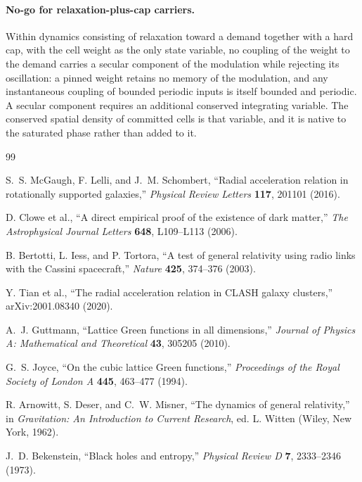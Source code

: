 \documentclass[11pt]{article}
\begin{document}
\paragraph{No-go for relaxation-plus-cap carriers.} Within dynamics consisting of relaxation toward a demand together with a hard cap, with the cell weight as the only state variable, no coupling of the weight to the demand carries a secular component of the modulation while rejecting its oscillation: a pinned weight retains no memory of the modulation, and any instantaneous coupling of bounded periodic inputs is itself bounded and periodic. A secular component requires an additional conserved integrating variable. The conserved spatial density of committed cells is that variable, and it is native to the saturated phase rather than added to it.

\begin{thebibliography}{99}

S.~S. McGaugh, F. Lelli, and J.~M. Schombert,
``Radial acceleration relation in rotationally supported galaxies,''
\emph{Physical Review Letters} \textbf{117}, 201101 (2016).

D. Clowe et al.,
``A direct empirical proof of the existence of dark matter,''
\emph{The Astrophysical Journal Letters} \textbf{648}, L109--L113 (2006).

B. Bertotti, L. Iess, and P. Tortora,
``A test of general relativity using radio links with the Cassini spacecraft,''
\emph{Nature} \textbf{425}, 374--376 (2003).

Y. Tian et al.,
``The radial acceleration relation in CLASH galaxy clusters,''
arXiv:2001.08340 (2020).

A.~J. Guttmann,
``Lattice Green functions in all dimensions,''
\emph{Journal of Physics A: Mathematical and Theoretical} \textbf{43}, 305205 (2010).

G.~S. Joyce,
``On the cubic lattice Green functions,''
\emph{Proceedings of the Royal Society of London A} \textbf{445}, 463--477 (1994).

R. Arnowitt, S. Deser, and C.~W. Misner,
``The dynamics of general relativity,''
in \emph{Gravitation: An Introduction to Current Research},
ed. L. Witten (Wiley, New York, 1962).

J.~D. Bekenstein,
``Black holes and entropy,''
\emph{Physical Review D} \textbf{7}, 2333--2346 (1973).


\end{thebibliography}
\end{document}
